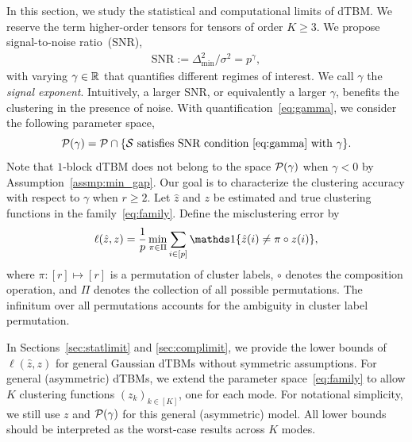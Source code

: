 \documentclass[lettersize,onecolumn,journal]{IEEEtran}
\theoremstyle{definition}
\theoremstyle{definition}
\begin{document}
In this section, we study the statistical and computational limits of dTBM. We reserve the term higher-order tensors for tensors of order $K\geq 3$. We propose signal-to-noise ratio~(SNR),
\begin{align}\label{eq:gamma}
  \text{SNR}:= \Delta^2_{\min}/\sigma^2 = p^{\gamma}, 
\end{align}
with varying $\gamma \in \mathbb{R}$ that quantifies different regimes of interest. We call $\gamma$ the \emph{signal exponent}. Intuitively, a larger SNR, or equivalently a larger $\gamma$, benefits the clustering in the presence of noise. With quantification~\eqref{eq:gamma}, we consider the following parameter space,
\begin{equation}\label{eq:gammafamily}
    \tP(\gamma) = \tP\cap\{\tS \text{ satisfies SNR condition~\eqref{eq:gamma} with $\gamma$} \}.
\end{equation}
Note that $1$-block dTBM does not belong to the space $\mathcal{P}(\gamma)$ when $\gamma < 0$ by Assumption~\ref{assmp:min_gap}. Our goal is to characterize the clustering accuracy with respect to $\gamma$ when $r \geq 2$. Let $\hat z$ and $z$ be estimated and true clustering functions in the family~\eqref{eq:family}. Define the misclustering error by
\[
\ell(\hat z, z)={1\over p}\min_{\pi \in \Pi}\sum_{i\in[p]}\ind\{\hat z(i)\neq \pi \circ z(i)\},
\]
where $\pi: [r] \mapsto [r]$ is a permutation of cluster labels, $\circ$ denotes the composition operation, and $\Pi$ denotes the collection of all possible permutations. The infinitum over all permutations accounts for the ambiguity in cluster label permutation. 

In Sections~\ref{sec:statlimit} and \ref{sec:complimit}, we provide the lower bounds of $\ell (\hat z, z)$ for general Gaussian dTBMs without symmetric assumptions. For general (asymmetric) dTBMs, we extend the parameter space~\eqref{eq:family} to allow $K$ clustering functions $(z_k)_{k\in[K]}$, one for each mode. For notational simplicity, we still use $z$ and $\mathcal{P}(\gamma)$ for this general (asymmetric) model. All lower bounds should be interpreted as the worst-case results across $K$ modes. 

\end{document}
